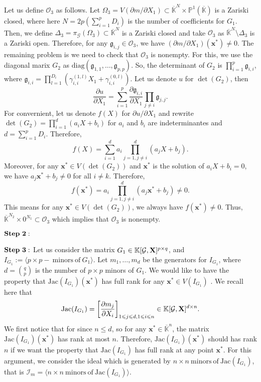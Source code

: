 \documentclass[11pt]{article}
\numberwithin{Property}{section}
\numberwithin{Theorem}{section}
\numberwithin{Proposition}{section}
\numberwithin{Lemma}{section}
\numberwithin{Corollary}{section}
\numberwithin{Definition}{section}
\numberwithin{Remark}{section}
\numberwithin{Conjecture}{section}
\numberwithin{Problem}{section}
\numberwithin{Example}{section}
\numberwithin{Claim}{section}
\renewcommand{\leq}{\leqslant}
\def\bar{\overline}
\newcommand{\field}{\mathbb{K}} %
\newcommand{\mat}[1]{\mathbf{\MakeUppercase{#1}}} %
\begin{document}
Let us define $\mathcal{O}_3$ as follows. Let $\Omega_3 = V(\partial m / \partial X_1) \subset \bar{\field}^N \times \mathbb{P}^1(\bar{\field})$ is a Zariski closed, where here $N = 2p(\sum_{i=1}^pD_i)$ is the number of coefficients for $G_1$. Then, we define $\Delta_3 = \pi_{\mathcal{G}}(\Omega_3) \subset \bar{\field}^{N}$ is a Zariski closed and take $\mathcal{O}_3$ as $\bar{\field}^{N} \setminus \Delta_3$ is a Zariski open. Therefore, for any $\mathfrak{g}_{i,j} \in \mathcal{O}_3$, we have $(\partial m / \partial X_1) (\mathbf{x}^*) \ne 0$. The remaining problem is we need to check that $\mathcal{O}_3$ is nonempty. For this, we use the diagonal marix $G_2$ as $\mathrm{diag}(\mathfrak{g}_{1,1}, \ldots, \mathfrak{g}_{p,p})$. So, the determinant of $G_2$ is $\prod_{i=1}^p\mathfrak{g}_{i,i}$, where $\mathfrak{g}_{i,i} = \prod_{l=1}^{D_i}(\gamma_{i,i}^{(1,l)}X_1 + \gamma_{i,i}^{(0,l)})$. Let us denote $u$ for $\det(G_2)$, then 
\[
\frac{\partial u}{\partial X_1} = \sum_{i = 1}^p\frac{\partial \mathfrak{g}_{i,i}}{\partial X_1}\prod_{j \ne i} \mathfrak{g}_{j,j}.
\]
For convernient, let us denote $f(X)$ for ${\partial u}/{\partial X_1}$ and rewrite $\det(G_2) = \prod_{i=1}^d(a_iX + b_i)$ for $a_i$ and $b_i$ are indeterminantes and $d = \sum_{i=1}^pD_i$. Therefore, 
\[
f(X) = \sum_{i = 1}^d a_i \prod_{j=1, j \ne i}^d(a_jX + b_j).
\]
Moreover, for any $\mathbf{x}^* \in V(\det(G_2))$ and $\mathbf{x}^* $ is the solution of $a_i X+ b_i = 0$, we have $a_j \mathbf{x}^* + b_j \ne 0$ for all $i \ne k$. Therefore, \[f(\mathbf{x}^*) = a_i\prod_{j=1, j \ne i}^d(a_j\mathbf{x}^* + b_j) \ne 0. \]
This means for any $\mathbf{x}^* \in V(\det(G_2))$, we always have $f(\mathbf{x}^*) \ne 0$. Thus, $\bar{\field}^{N_2} \times 0^{N_1} \subset \mathcal{O}_3$ which implies that $\mathcal{O}_3$ is nonempty. 

$\bf{Step \ 2:}$

$\bf{Step \ 3:}$
Let us consider the matrix $G_1 \in \field[\mathcal{G}, \mat{X}]^{p \times q}$, and $I_{G_1} := \langle p \times p - \ \mathrm{minors \ of } \ G_1 \rangle$. Let $m_1, \ldots, m_d$ be the generators for $I_{G_1}$, where $d = {{q}\choose{p}}$ is the number of $p \times p$ minors of $G_1$. We would like to have the property that $\mathrm{Jac}(I_{G_1})(\mathbf{x}^*)$ has full rank for any $\mathbf{x}^* \in V(I_{G_1})$ . We recall here that $$\mathrm{Jac}(I_{G_1}) = \left[\frac{\partial m_j}{\partial X_i}\right]_{1 \leq j \leq d, 1 \leq i \leq n} \in \field[\mathcal{G}, \mat{X}]^{d \times n}. $$
We first notice that for since $n \leq d$, so for any $\mathbf{x}^* \in \bar{\field}^n$, the matrix $\mathrm{Jac}(I_{G_1})(\mathbf{x}^*)$ has rank at most $n$. Therefore, $\mathrm{Jac}(I_{G_1})(\mathbf{x}^*)$ should has rank $n$ if we want the property that $\mathrm{Jac}(I_{G_1})$ has full rank at any point $\mathbf{x}^*$. For this argument, we consider the ideal which is generated by $n \times n \ \mathrm{minors \ of} \ \mathrm{Jac}(I_{G_1})$, that is $\mathcal{I}_{m} = \langle n \times n  \ \mathrm{minors \ of} \ \mathrm{Jac}(I_{G_1}) \rangle$.
\end{document}

